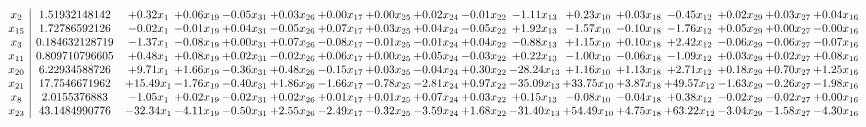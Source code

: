 \documentclass[9pt]{article}
\begin{document}
 \[\begin{array}{c| c c@{\hskip 2pt} c@{\hskip 2pt} c@{\hskip 2pt} c@{\hskip 2pt} c@{\hskip 2pt} c@{\hskip 2pt} c@{\hskip 2pt} c@{\hskip 2pt} c@{\hskip 2pt} c@{\hskip 2pt} c@{\hskip 2pt} c@{\hskip 2pt} c@{\hskip 2pt} c@{\hskip 2pt} c@{\hskip 2pt} }
 x_{2}   &  1.51932148142 & +  0.32 x_{1} & +  0.06 x_{19} & -0.05 x_{31} & +  0.03 x_{26} & +  0.00 x_{17} & +  0.00 x_{25} & +  0.02 x_{24} & -0.01 x_{22} & -1.11 x_{13} & +  0.23 x_{10} & +  0.03 x_{18} & -0.45 x_{12} & +  0.02 x_{29} & +  0.03 x_{27} & +  0.04 x_{16}\\
 x_{15}   &  1.72786592126 & -0.02 x_{1} & -0.01 x_{19} & +  0.04 x_{31} & -0.05 x_{26} & +  0.07 x_{17} & +  0.03 x_{25} & +  0.04 x_{24} & -0.05 x_{22} & +  1.92 x_{13} & -1.57 x_{10} & -0.10 x_{18} & -1.76 x_{12} & +  0.05 x_{29} & +  0.00 x_{27} & -0.00 x_{16}\\
 x_{3}   &  0.184632128719 & -1.37 x_{1} & -0.08 x_{19} & +  0.00 x_{31} & +  0.07 x_{26} & -0.08 x_{17} & -0.01 x_{25} & -0.01 x_{24} & +  0.04 x_{22} & -0.88 x_{13} & +  1.15 x_{10} & +  0.10 x_{18} & +  2.42 x_{12} & -0.06 x_{29} & -0.06 x_{27} & -0.07 x_{16}\\
 x_{11}   &  0.809710796605 & +  0.48 x_{1} & +  0.08 x_{19} & +  0.02 x_{31} & -0.02 x_{26} & +  0.06 x_{17} & +  0.00 x_{25} & +  0.05 x_{24} & -0.03 x_{22} & +  0.22 x_{13} & -1.00 x_{10} & -0.06 x_{18} & -1.09 x_{12} & +  0.03 x_{29} & +  0.02 x_{27} & +  0.08 x_{16}\\
 x_{20}   &  6.22934588726 & +  9.71 x_{1} & +  1.66 x_{19} & -0.36 x_{31} & +  0.48 x_{26} & -0.15 x_{17} & +  0.03 x_{25} & -0.04 x_{24} & +  0.30 x_{22} & -28.24 x_{13} & +  1.16 x_{10} & +  1.13 x_{18} & +  2.71 x_{12} & +  0.18 x_{29} & +  0.70 x_{27} & +  1.25 x_{16}\\
 x_{21}   &  17.7546671962 & + 15.49 x_{1} & -1.76 x_{19} & -0.40 x_{31} & +  1.86 x_{26} & -1.66 x_{17} & -0.78 x_{25} & -2.81 x_{24} & +  0.97 x_{22} & -35.09 x_{13} & + 33.75 x_{10} & +  3.87 x_{18} & + 49.57 x_{12} & -1.63 x_{29} & -0.26 x_{27} & -1.98 x_{16}\\
 x_{8}   &  2.0155376883 & -1.05 x_{1} & +  0.02 x_{19} & -0.02 x_{31} & +  0.02 x_{26} & +  0.01 x_{17} & +  0.01 x_{25} & +  0.07 x_{24} & +  0.03 x_{22} & +  0.15 x_{13} & -0.08 x_{10} & -0.04 x_{18} & +  0.38 x_{12} & -0.02 x_{29} & -0.02 x_{27} & +  0.00 x_{16}\\
 x_{23}   &  43.1484990776 & -32.34 x_{1} & -4.11 x_{19} & -0.50 x_{31} & +  2.55 x_{26} & -2.49 x_{17} & -0.32 x_{25} & -3.59 x_{24} & +  1.68 x_{22} & -31.40 x_{13} & + 54.49 x_{10} & +  4.75 x_{18} & + 63.22 x_{12} & -3.04 x_{29} & -1.58 x_{27} & -4.30 x_{16}\\

\end{array}\]
\end{document}

